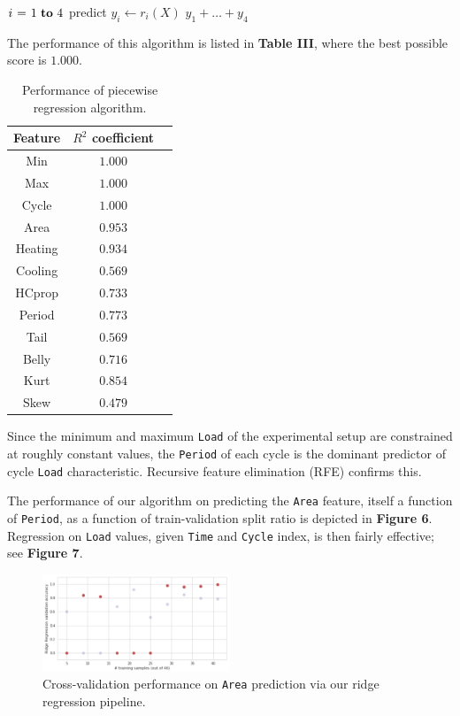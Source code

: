 \documentclass[letterpaper, 10 pt, conference]{ieeeconf}  %
\begin{document}
\begin{codebox}
  \li \For $i \gets 1 \To 4$ \Do
    \li predict $y_i \gets r_i(X)$
  \End
  \li \Return $y_1 + \dots + y_4$
\end{codebox}

The performance of this algorithm is listed in \textbf{Table III}, where the best possible score is $1.000$.

\begin{table}[h]
  \centering
  \begin{tabular}{ c | c c }
    \textbf{Feature} & \textbf{$R^2$ coefficient} \\
    \hline
    Min & $1.000$ \\
    Max & $1.000$ \\
    Cycle & $1.000$ \\
    Area & $0.953$ \\
    Heating & $0.934$ \\
    Cooling & $0.569$ \\
    HCprop & $0.733$ \\
    Period & $0.773$ \\
    Tail & $0.569$ \\
    Belly & $0.716$ \\
    Kurt & $0.854$ \\
    Skew & $0.479$
  \end{tabular}
  \label{Performance}
  \caption{Performance of piecewise regression algorithm.}
\end{table}

Since the minimum and maximum \verb|Load| of the experimental setup are constrained at roughly constant values, the \verb|Period| of each cycle is the dominant predictor of cycle \verb|Load| characteristic. Recursive feature elimination (RFE) confirms this. 

The performance of our algorithm on predicting the \verb|Area| feature, itself a function of \verb|Period|, as a function of train-validation split ratio is depicted in \textbf{Figure 6}. Regression on \verb|Load| values, given \verb|Time| and \verb|Cycle| index, is then fairly effective; see \textbf{Figure 7}.

\label{Split}
\begin{figure}[h!]
	\centering
	\includegraphics[width=0.5\textwidth]{assets/validation_performance.png}
  \caption{Cross-validation performance on \texttt{Area} prediction via our ridge regression pipeline.}
\end{figure}
\end{document}
